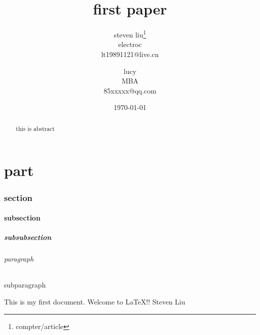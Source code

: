 \documentclass[titlepage]{report}
\title{first paper}
\author{steven liu\thanks{compter/article}\\
electroc\\
lt19891121@live.cn \and
lucy\\
MBA\\
85xxxxx@qq.com
}
\date{\today}
\begin{document}
\maketitle
\renewcommand{\abstractname}{summary}
\begin{abstract}
this is abstract
\end{abstract}
\setcounter{tocdepth}{3}
\tableofcontents
{}
\part{part}
\section{section}
\subsection{subsection}
\subsubsection{subsubsection}
\paragraph{paragraph}
\subparagraph{subparagraph}
This is my first document.
Welcome to \LaTeX !!
Steven Liu
\end{document}

